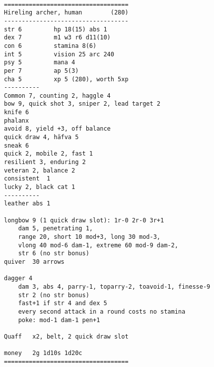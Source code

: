 \

\goodbreak \begin{samepage} \small \begin{verbatim}
===================================
Hireling archer, human        (280)
-----------------------------------
str	6         hp 18(15) abs 1
dex	7         m1 w3 r6 d11(10)
con	6         stamina 8(6)
int 5         vision 25 arc 240
psy	5         mana 4
per	7         ap 5(3)
cha	5         xp 5 (280), worth 5xp
----------
Common 7, counting 2, haggle 4
bow 9, quick shot 3, sniper	2, lead target 2
knife 6
phalanx
avoid 8, yield +3, off balance
quick draw 4, häfva	5
sneak 6
quick 2, mobile 2, fast 1
resilient 3, enduring 2
veteran 2, balance 2
consistent	1
lucky 2, black cat 1
----------
leather abs 1

longbow	9 (1 quick draw slot): 1r-0 2r-0 3r+1
	dam 5, penetrating 1,
	range 20, short 10 mod+3, long 30 mod-3,
	vlong 40 mod-6 dam-1, extreme 60 mod-9 dam-2,
	str 6 (no str bonus)
quiver	30 arrows

dagger 4
    dam 3, abs 4, parry-1, toparry-2, toavoid-1, finesse-9
    str 2 (no str bonus)
    fast+1 if str 4 and dex 5
    every second attack in a round costs no stamina
    poke: mod-1 dam-1 pen+1

Quaff	x2, belt, 2 quick draw slot

money	2g 1d10s 1d20c
===================================
\end{verbatim} \normalsize \end{samepage}

\

